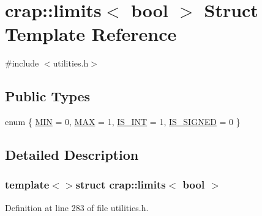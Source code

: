 \hypertarget{structcrap_1_1limits_3_01bool_01_4}{\section{crap\+:\+:limits$<$ bool $>$ Struct Template Reference}
\label{structcrap_1_1limits_3_01bool_01_4}
}


{\ttfamily \#include $<$utilities.\+h$>$}

\subsection*{Public Types}
\begin{DoxyCompactItemize}
\item 
enum \{ \hyperlink{structcrap_1_1limits_3_01bool_01_4_af27b2b0a135c27820b952d2361e1cbc7a9a55bfd482f1eb8c71b02333050b7562}{M\+I\+N} = 0, 
\hyperlink{structcrap_1_1limits_3_01bool_01_4_af27b2b0a135c27820b952d2361e1cbc7a6b42ad4f43c39965b3511bba1dd28617}{M\+A\+X} = 1, 
\hyperlink{structcrap_1_1limits_3_01bool_01_4_af27b2b0a135c27820b952d2361e1cbc7a2de281e498030a18240f61dc484ec205}{I\+S\+\_\+\+I\+N\+T} = 1, 
\hyperlink{structcrap_1_1limits_3_01bool_01_4_af27b2b0a135c27820b952d2361e1cbc7a47976b05af95957aa2d4187566f277fa}{I\+S\+\_\+\+S\+I\+G\+N\+E\+D} = 0
 \}
\end{DoxyCompactItemize}


\subsection{Detailed Description}
\subsubsection*{template$<$$>$struct crap\+::limits$<$ bool $>$}



Definition at line 283 of file utilities.\+h.



